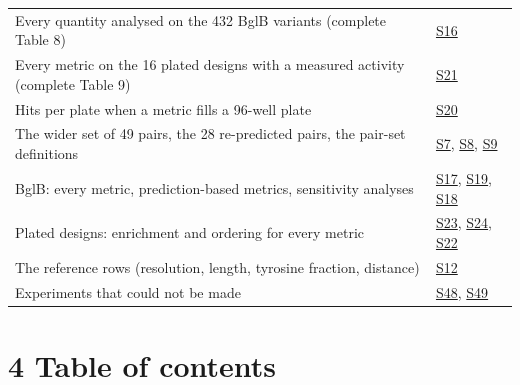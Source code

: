 \documentclass[
  10pt,
]{article}
\DeclareRobustCommand{\_}{\textunderscore\hspace{0pt}}
\begin{document}
{\begin{longtable}[]{@{}
  >{\raggedright\arraybackslash}p{}
  >{\raggedright\arraybackslash}p{}@{}}
Every quantity
analysed on the 432
BglB variants
(complete Table 8) &
\protect\hyperlink{S16}{S16} \\
Every metric on the
16 plated designs
with a measured
activity (complete
Table 9) &
\protect\hyperlink{S21}{S21} \\
Hits per plate when
a metric fills a
96-well plate &
\protect\hyperlink{S20}{S20} \\
The wider set of 49
pairs, the 28
re-predicted pairs,
the pair-set
definitions &
\protect\hyperlink{S7}{S7},
\protect\hyperlink{S8}{S8},
\protect\hyperlink{S9}{S9} \\
BglB: every metric,
prediction-based
metrics, sensitivity
analyses &
\protect\hyperlink{S17}{S17},
\protect\hyperlink{S19}{S19},
\protect\hyperlink{S18}{S18} \\
Plated designs:
enrichment and
ordering for every
metric &
\protect\hyperlink{S23}{S23},
\protect\hyperlink{S24}{S24},
\protect\hyperlink{S22}{S22} \\
The reference rows
(resolution, length,
tyrosine fraction,
distance) &
\protect\hyperlink{S12}{S12} \\
Experiments that
could not be made &
\protect\hyperlink{S48}{S48},
\protect\hyperlink{S49}{S49} \\
\end{longtable}

}

\section{4 Table of
contents}
\end{document}
